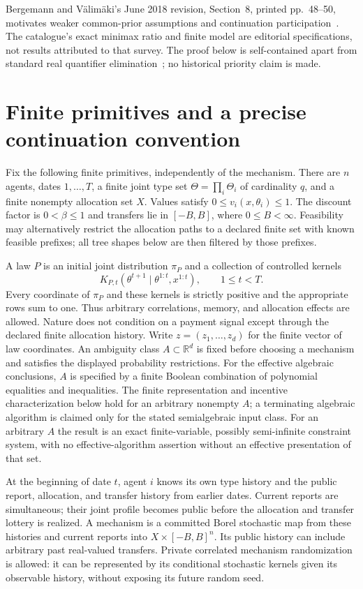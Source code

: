 \documentclass[11pt,a4paper]{article}
\begin{document}
Bergemann and V\"alim\"aki's June 2018 revision, Section~8, printed
pp.~48--50, motivates weaker common-prior assumptions and continuation
participation~\cite{BV}. The catalogue's exact minimax ratio and finite model
are editorial specifications, not results attributed to that survey.
The proof below is self-contained apart from standard real quantifier
elimination~\cite{Collins}; no historical priority claim is made.

\section{Finite primitives and a precise continuation convention}
\label{sec:primitives}

Fix the following finite primitives, independently of the mechanism.
There are $n$ agents, dates $1,\ldots,T$, a finite joint type set
$\Theta=\prod_i\Theta_i$ of cardinality $q$, and a finite nonempty
allocation set $X$. Values satisfy $0\leq v_i(x,\theta_i)\leq1$.
The discount factor is $0<\beta\leq1$ and transfers lie in $[-B,B]$,
where $0\leq B<\infty$. Feasibility may alternatively restrict the
allocation paths to a declared finite set with known feasible prefixes;
all tree shapes below are then filtered by those prefixes.

A law $P$ is an initial joint distribution $\pi_P$ and a collection of
controlled kernels
\[
 K_{P,t}(\theta^{t+1}\mid\theta^{1:t},x^{1:t}),
 \qquad 1\leq t<T.
 \tag{F1}
\]
Every coordinate of $\pi_P$ and these kernels is strictly positive and
the appropriate rows sum to one. Thus arbitrary correlations, memory,
and allocation effects are allowed. Nature does not condition on a
payment signal except through the declared finite allocation history.
Write $z=(z_1,\ldots,z_d)$ for the finite vector of law coordinates.
An ambiguity class $A\subset\mathbb R^d$ is fixed before choosing a
mechanism and satisfies the displayed probability restrictions.
For the effective algebraic conclusions, $A$ is specified by a finite
Boolean combination of polynomial equalities and inequalities.
The finite representation and incentive characterization below hold
for an arbitrary nonempty $A$; a terminating algebraic algorithm is
claimed only for the stated semialgebraic input class. For an arbitrary
$A$ the result is an exact finite-variable, possibly semi-infinite
constraint system, with no effective-algorithm assertion without an
effective presentation of that set.

At the beginning of date $t$, agent $i$ knows its own type history and
the public report, allocation, and transfer history from earlier dates.
Current reports are simultaneous; their joint profile becomes public
before the allocation and transfer lottery is realized. A mechanism is
a committed Borel stochastic map from these histories and current
reports into $X\times[-B,B]^n$. Its public history can include arbitrary
past real-valued transfers. Private correlated mechanism randomization
is allowed: it can be represented by its conditional stochastic kernels
given its observable history, without exposing its future random seed.
\end{document}
